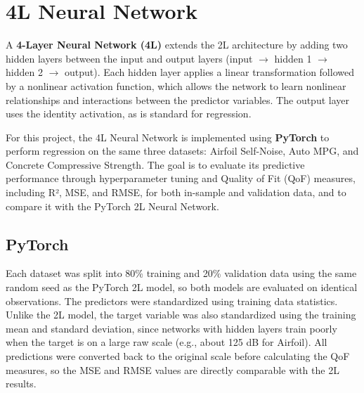 \section{4L Neural Network}
A \textbf{4-Layer Neural Network (4L)} extends the 2L architecture by adding two hidden layers between the input and output layers (input $\rightarrow$ hidden 1 $\rightarrow$ hidden 2 $\rightarrow$ output). Each hidden layer applies a linear transformation followed by a nonlinear activation function, which allows the network to learn nonlinear relationships and interactions between the predictor variables. The output layer uses the identity activation, as is standard for regression.
\medskip

For this project, the 4L Neural Network is implemented using \textbf{PyTorch} to perform regression on the same three datasets: Airfoil Self-Noise, Auto MPG, and Concrete Compressive Strength. The goal is to evaluate its predictive performance through hyperparameter tuning and Quality of Fit (QoF) measures, including R², MSE, and RMSE, for both in-sample and validation data, and to compare it with the PyTorch 2L Neural Network.

\subsection{PyTorch}
Each dataset was split into 80\% training and 20\% validation data using the same random seed as the PyTorch 2L model, so both models are evaluated on identical observations. The predictors were standardized using training data statistics. Unlike the 2L model, the target variable was also standardized using the training mean and standard deviation, since networks with hidden layers train poorly when the target is on a large raw scale (e.g., about 125 dB for Airfoil). All predictions were converted back to the original scale before calculating the QoF measures, so the MSE and RMSE values are directly comparable with the 2L results.
\medskip

